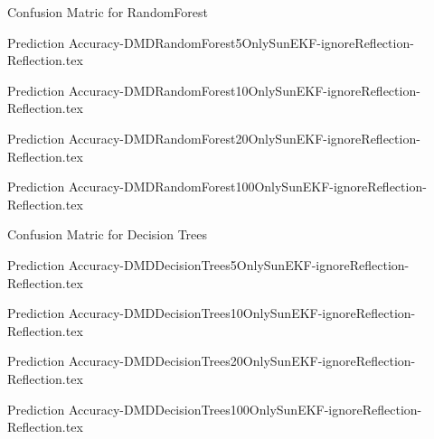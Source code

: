 \documentclass[letterpaper, 10 pt, conference]{ieeeconf}  %
\begin{document}
\begin{table*}
	\caption{Confusion Matric for RandomForest} 
	\label{Table: Prediction Accuracy-DMDRandomForestOnlySunEKF-ignoreReflection-Reflection} 
	\centering
	\begin{minipage}[c]{0.2\textwidth}
		{Prediction Accuracy-DMDRandomForest5OnlySunEKF-ignoreReflection-Reflection.tex}
	\end{minipage}
	\begin{minipage}[c]{0.2\textwidth}
		{Prediction Accuracy-DMDRandomForest10OnlySunEKF-ignoreReflection-Reflection.tex}
	\end{minipage}
	\begin{minipage}[c]{0.2\textwidth}
		{Prediction Accuracy-DMDRandomForest20OnlySunEKF-ignoreReflection-Reflection.tex}
	\end{minipage}
	\begin{minipage}[c]{0.2\textwidth}
		{Prediction Accuracy-DMDRandomForest100OnlySunEKF-ignoreReflection-Reflection.tex}
	\end{minipage}
\end{table*}

\begin{table*}
	\caption{Confusion Matric for Decision Trees} 
	\label{Table: Prediction Accuracy-DMDDecsionTreesOnlySunEKF-ignoreReflection-Reflection} 
	\centering
	\begin{minipage}[c]{0.2\textwidth}
		{Prediction Accuracy-DMDDecisionTrees5OnlySunEKF-ignoreReflection-Reflection.tex}
	\end{minipage}
	\begin{minipage}[c]{0.2\textwidth}
		{Prediction Accuracy-DMDDecisionTrees10OnlySunEKF-ignoreReflection-Reflection.tex}
	\end{minipage}
	\begin{minipage}[c]{0.2\textwidth}
		{Prediction Accuracy-DMDDecisionTrees20OnlySunEKF-ignoreReflection-Reflection.tex}
	\end{minipage}
	\begin{minipage}[c]{0.2\textwidth}
		{Prediction Accuracy-DMDDecisionTrees100OnlySunEKF-ignoreReflection-Reflection.tex}
	\end{minipage}
\end{table*}
\end{document}
